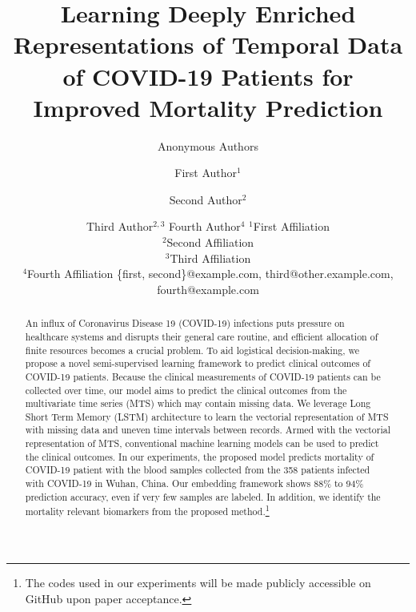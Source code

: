 \documentclass{article}
\title{Learning Deeply Enriched Representations of Temporal Data of COVID-19 Patients for Improved Mortality Prediction}
\author{
    Anonymous Authors
}
\author{
First Author$^1$
\and
Second Author$^2$\and
Third Author$^{2,3}$\And
Fourth Author$^4$
\affiliations
$^1$First Affiliation\\
$^2$Second Affiliation\\
$^3$Third Affiliation\\
$^4$Fourth Affiliation
\emails
\{first, second\}@example.com,
third@other.example.com,
fourth@example.com
}
\begin{document}
\maketitle

\begin{abstract}
    \iffalse
    Learning compressed representations of multivariate time series (MTS) facilitates data analysis in the presence of noise and redundant information, and for a large number of variates and time steps. However, classical dimensionality reduction approaches are designed for vectorial data and cannot deal explicitly with missing values. In this work, we propose a novel autoencoder architecture based on recurrent neural networks to generate compressed representations of MTS.
    
    Although semi-supervised variational autoencoder (SemiVAE) works in image classiﬁcation task, it fails in text classiﬁcation task if using vanilla LSTM as its decoder. From a perspective of reinforcement learning, it is veriﬁed that the decoder’s capability to distinguish between different categorical labels is essential. Therefore, Semi-supervised Sequential Variational Autoencoder (SSVAE) is proposed, which increases the capability by feeding label into its decoder RNN at each time-step. Two speciﬁc decoder structures are investigated and both of them are veriﬁed to be effective.
    \fi
    An influx of Coronavirus Disease 19 (COVID-19) infections puts pressure on healthcare systems and disrupts their general care routine, and efficient allocation of finite resources becomes a crucial problem. To aid logistical decision-making, we propose a novel semi-supervised learning framework to predict clinical outcomes of COVID-19 patients. Because the clinical measurements of COVID-19 patients can be collected over time, our model aims to predict the clinical outcomes from the multivariate time series (MTS) which may contain missing data. We leverage Long Short Term Memory (LSTM) architecture to learn the vectorial representation of MTS with missing data and uneven time intervals between records. Armed with the vectorial representation of MTS, conventional machine learning models can be used to predict the clinical outcomes. In our experiments, the proposed model predicts mortality of COVID-19 patient with the blood samples collected from the 358 patients infected with COVID-19 in Wuhan, China. Our embedding framework shows 88\% to 94\% prediction accuracy, even if very few samples are labeled. In addition, we identify the mortality relevant biomarkers from the proposed method.\footnote{The codes used in our experiments will be made publicly accessible on GitHub upon paper acceptance.}

\end{abstract}
\end{document}
